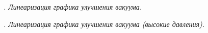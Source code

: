\documentclass[a4paper]{article}
\begin{document}
\begin{itemize}
\begin{figure}
\caption{\textit{. Линеаризация графика улучшения вакуума.}}
\end{figure}

\begin{figure}
\caption{\textit{. Линеаризация графика улучшения вакуума (высокие давления).}}
\end{figure}


\end{itemize}
\end{document}
